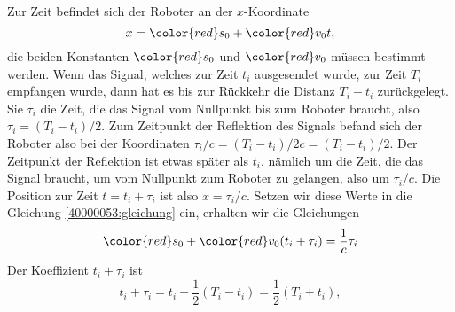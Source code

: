 \begin{loesung}
\begin{figure}
\centering
{}
\end{figure}
Zur Zeit befindet sich der Roboter an der $x$-Koordinate
\begin{equation}
x = {\color{red}s_0} + {\color{red}v_0}t,
\label{40000053:gleichung}
\end{equation}
die beiden Konstanten
$\color{red}s_0$
und
$\color{red}v_0$
müssen bestimmt werden.
Wenn das Signal, welches zur Zeit $t_i$ ausgesendet wurde, zur Zeit $T_i$
empfangen wurde, dann hat es bis zur Rückkehr die Distanz $T_i-t_i$
zurückgelegt.
Sie $\tau_i$ die Zeit, die das Signal vom Nullpunkt bis zum Roboter
braucht, also $\tau_i = (T_i-t_i)/2$.
Zum Zeitpunkt der Reflektion des Signals befand sich der Roboter also bei
der Koordinaten $\tau_i/c=(T_i - t_i)/2c=(T_i-t_i)/2$.
Der Zeitpunkt der Reflektion ist etwas später als $t_i$, nämlich
um die Zeit, die das Signal braucht, um vom Nullpunkt zum Roboter
zu gelangen, also um $\tau_i/c$.
Die Position zur Zeit $t=t_i + \tau_i$ ist also $x=\tau_i/c$.
Setzen wir diese Werte in die Gleichung
\eqref{40000053:gleichung}
ein, erhalten wir die Gleichungen
\begin{equation}
{\color{red}s_0} + {\color{red}v_0}(t_i+\tau_i) = \frac1c\tau_i
\label{40000053:glsys}
\end{equation}
Der Koeffizient $t_i+\tau_i$ ist
\[
t_i+\tau_i = t_i + \frac12(T_i-t_i)=\frac12(T_i+t_i),
\]
\end{loesung}
